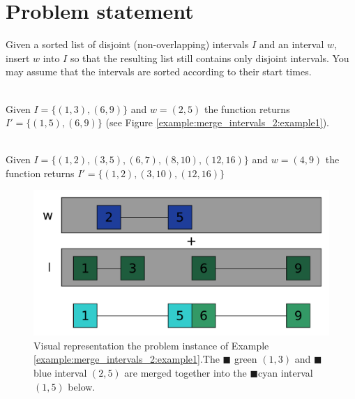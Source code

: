 \section{Problem statement}
\begin{exercise}
\label{example:merge_intervals_2:exercice1_2}

Given a sorted list of disjoint (non-overlapping) intervals $I$ and an interval $w$, insert $w$ into $I$ so that the resulting list still contains only disjoint intervals.
You may assume that the intervals are sorted according to their start times.

	\begin{example}
		\label{example:merge_intervals_2:example1}
		\hfill \\
		Given $I=\{(1,3),(6,9)\}$ and $w=(2,5)$ the function returns $I'=\{(1,5),(6,9)\}$ (see Figure \ref{example:merge_intervals_2:example1}).
	\end{example}

	\begin{example}
		\label{example:merge_intervals_2:example2}
		\hfill \\
		Given $I=\{(1,2),(3,5),(6,7),(8,10),(12,16)\}$ and $w=(4,9)$ the function returns $I'=\{(1,2),(3,10),(12,16)\}$
	\end{example}

\end{exercise}

\begin{figure}
	\centering
	\includegraphics[width=\textwidth]{sources/merge_intervals_2/images/example1}
	\caption[Implicit graph for the Example \ref{example:merge_intervals_2:example1}.]
	{Visual representation the problem instance of Example
	\ref{example:merge_intervals_2:example1}.The \textcolor[HTML]{339966}{$\blacksquare$} green $(1,3)$ and \textcolor[HTML]{3366ff}{$\blacksquare$} blue interval $(2,5)$  are merged together into the \textcolor[HTML]{33cccc}{$\blacksquare$}cyan interval $(1,5)$ below.}
	\label{fig:merge_intervals_2:example1}
\end{figure}


